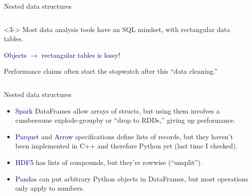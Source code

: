 \documentclass[aspectratio=169]{beamer}
\begin{document}
\begin{frame}{Nested data structures}
\begin{columns}[t]
\vspace{0.25 cm}
\begin{uncoverenv}<3->
Most data analysis tools have an SQL mindset, with rectangular data tables.

\vspace{0.25 cm}
\textcolor{darkblue}{Objects $\to$ rectangular tables is lossy!}

\vspace{0.25 cm}
Performance claims often start the stopwatch after this ``data cleaning.''
\end{uncoverenv}
\end{columns}
\end{frame}

\begin{frame}{Nested data structures}
\large
\vspace{0.5 cm}
 \hfill {}

\vspace{0.75 cm}
\begin{itemize}\setlength{\itemsep}{0.35 cm}
\item<3-> \textcolor{darkblue}{Spark} DataFrames allow arrays of structs, but using them involves a cumbersome explode-groupby or ``drop to RDDs,'' giving up performance.
\item<4-> \textcolor{darkblue}{Parquet} and \textcolor{darkblue}{Arrow} specifications define lists of records, but they haven't been implemented in C++ and therefore Python yet (last time I checked).
\item<5-> \textcolor{darkblue}{HDF5} has lists of compounds, but they're rowwise (``unsplit'').
\item<6-> \textcolor{darkblue}{Pandas} can put arbitrary Python objects in DataFrames, but most operations only apply to numbers.
\end{itemize}
\end{frame}
\end{document}
